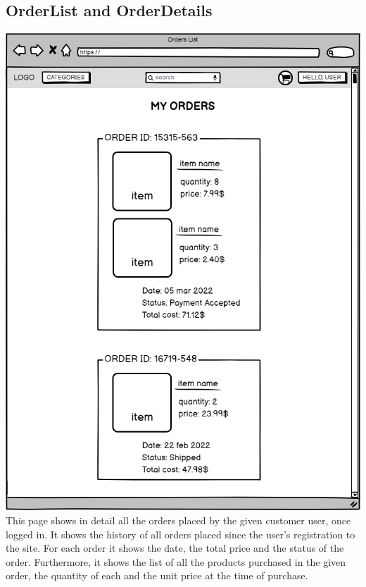 \subsection{OrderList and OrderDetails}
    \includegraphics[width=\textwidth,height=\textheight,keepaspectratio]{mockups/ordersPageMockup.png}
\\
This page shows in detail all the orders placed by the given customer user, once logged in. It shows the history of all orders placed since the user's registration to the site. For each order it shows the date, the total price and the status of the order.
Furthermore, it shows the list of all the products purchased in the given order, the quantity of each and the unit price at the time of purchase.

